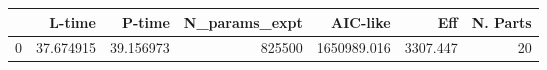 \begin{tabular}{lrrrrrr}
\toprule
{} &     L-time &     P-time &  N\_params\_expt &     AIC-like &       Eff &  N. Parts \\
\midrule
0 &  37.674915 &  39.156973 &         825500 &  1650989.016 &  3307.447 &        20 \\
\bottomrule
\end{tabular}
